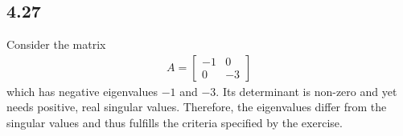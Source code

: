 \documentclass[letterpaper,12pt]{article}
\theoremstyle{definition}
\begin{document}
\subsection*{4.27}
Consider the matrix
\begin{align*}
    A = \begin{bmatrix}
    -1 & 0\\
    0 & -3
    \end{bmatrix}
\end{align*}
which has negative eigenvalues $-1$ and $-3$. Its determinant is non-zero and yet needs positive, real singular values. Therefore, the eigenvalues differ from the singular values and thus fulfills the criteria specified by the exercise.
\end{document}
